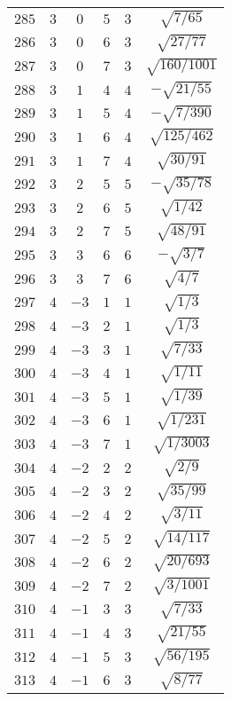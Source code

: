 \begin{table}
\begin{center}
\begin{tabular}{|c|c|c|c|c|c|}
$285$ & $3$ & $0$ & $5$ & $3$ & $\sqrt{7/65}$ \\ 
$286$ & $3$ & $0$ & $6$ & $3$ & $\sqrt{27/77}$ \\ 
$287$ & $3$ & $0$ & $7$ & $3$ & $\sqrt{160/1001}$ \\ 
$288$ & $3$ & $1$ & $4$ & $4$ & $-\sqrt{21/55}$ \\ 
$289$ & $3$ & $1$ & $5$ & $4$ & $-\sqrt{7/390}$ \\ 
$290$ & $3$ & $1$ & $6$ & $4$ & $\sqrt{125/462}$ \\ 
$291$ & $3$ & $1$ & $7$ & $4$ & $\sqrt{30/91}$ \\ 
$292$ & $3$ & $2$ & $5$ & $5$ & $-\sqrt{35/78}$ \\ 
$293$ & $3$ & $2$ & $6$ & $5$ & $\sqrt{1/42}$ \\ 
$294$ & $3$ & $2$ & $7$ & $5$ & $\sqrt{48/91}$ \\ 
$295$ & $3$ & $3$ & $6$ & $6$ & $-\sqrt{3/7}$ \\ 
$296$ & $3$ & $3$ & $7$ & $6$ & $\sqrt{4/7}$ \\ 
$297$ & $4$ & $-3$ & $1$ & $1$ & $\sqrt{1/3}$ \\ 
$298$ & $4$ & $-3$ & $2$ & $1$ & $\sqrt{1/3}$ \\ 
$299$ & $4$ & $-3$ & $3$ & $1$ & $\sqrt{7/33}$ \\ 
$300$ & $4$ & $-3$ & $4$ & $1$ & $\sqrt{1/11}$ \\ 
$301$ & $4$ & $-3$ & $5$ & $1$ & $\sqrt{1/39}$ \\ 
$302$ & $4$ & $-3$ & $6$ & $1$ & $\sqrt{1/231}$ \\ 
$303$ & $4$ & $-3$ & $7$ & $1$ & $\sqrt{1/3003}$ \\ 
$304$ & $4$ & $-2$ & $2$ & $2$ & $\sqrt{2/9}$ \\ 
$305$ & $4$ & $-2$ & $3$ & $2$ & $\sqrt{35/99}$ \\ 
$306$ & $4$ & $-2$ & $4$ & $2$ & $\sqrt{3/11}$ \\ 
$307$ & $4$ & $-2$ & $5$ & $2$ & $\sqrt{14/117}$ \\ 
$308$ & $4$ & $-2$ & $6$ & $2$ & $\sqrt{20/693}$ \\ 
$309$ & $4$ & $-2$ & $7$ & $2$ & $\sqrt{3/1001}$ \\ 
$310$ & $4$ & $-1$ & $3$ & $3$ & $\sqrt{7/33}$ \\ 
$311$ & $4$ & $-1$ & $4$ & $3$ & $\sqrt{21/55}$ \\ 
$312$ & $4$ & $-1$ & $5$ & $3$ & $\sqrt{56/195}$ \\ 
$313$ & $4$ & $-1$ & $6$ & $3$ & $\sqrt{8/77}$ \\ 

\end{tabular}
\end{center}
\end{table}
